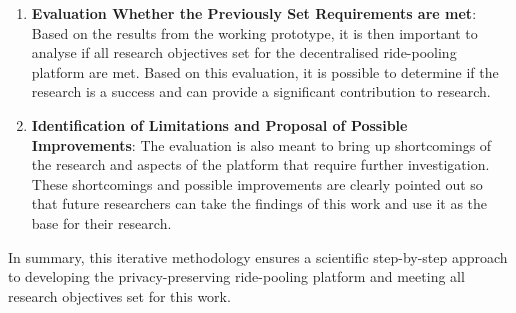 \begin{enumerate}
    \item \textbf{Evaluation Whether the Previously Set Requirements are met}: 
    Based on the results from the working prototype, it is then important to analyse if all research objectives set for the decentralised ride-pooling platform are met. Based on this evaluation, it is possible to determine if the research is a success and can provide a significant contribution to research.

    \item \textbf{Identification of Limitations and Proposal of Possible Improvements}:
    The evaluation is also meant to bring up shortcomings of the research and aspects of the platform that require further investigation. These shortcomings and possible improvements are clearly pointed out so that future researchers can take the findings of this work and use it as the base for their research.

\end{enumerate}

In summary, this iterative methodology ensures a scientific step-by-step approach to developing the  privacy-preserving ride-pooling platform and meeting all research objectives set for this work.